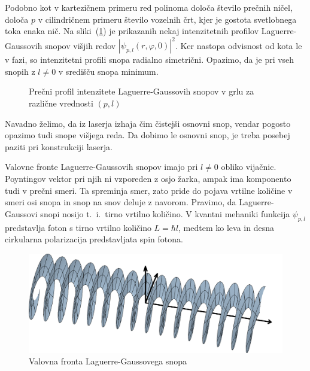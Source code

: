 Podobno kot v kartezičnem primeru red polinoma določa število prečnih ničel,
določa $p$ v cilindričnem primeru število vozelnih črt, kjer je gostota 
svetlobnega toka enaka nič. Na sliki~(\ref{fig:Laguerrovi_presek})
je prikazanih nekaj intenzitetnih profilov Laguerre-Gaussovih snopov
višjih redov $|\psi_{p,l}(r, \varphi, 0)|^2$. Ker nastopa  odvisnost od kota
le v fazi, so intenzitetni profili snopa radialno simetrični. Opazimo, da je pri  
vseh snopih z $l \ne 0$ v središču snopa minimum. 
\begin{figure}[h]
\centering
\def\svgwidth{110truemm} 

\caption{Prečni profil intenzitete Laguerre-Gaussovih snopov v grlu 
za različne vrednosti $(p,l)$}
\label{fig:Laguerrovi_presek}
\end{figure}

Navadno želimo, da iz laserja izhaja čim čistejši osnovni snop, vendar
pogosto opazimo tudi snope višjega reda. Da dobimo le osnovni
snop, je treba posebej paziti pri konstrukciji laserja.

\begin{remark}
Valovne fronte Laguerre-Gaussovih snopov imajo pri $l\ne0$  obliko vijačnic. 
Poyntingov vektor 
pri njih ni vzporeden z osjo žarka, ampak ima komponento tudi v prečni smeri. Ta spreminja smer, 
zato pride do pojava vrtilne količine v smeri osi snopa in snop na snov deluje z navorom. 
Pravimo, da Laguerre-Gaussovi snopi nosijo t.\ i.\ tirno vrtilno količino. 
V kvantni mehaniki funkcija $\psi_{p,l}$ predstavlja foton s tirno vrtilno količino $L = \hbar l$, 
medtem ko leva in desna cirkularna polarizacija predstavljata spin fotona. 
\begin{figure}[h]
\centering
\includegraphics[width=10truecm]{slike/03_Laguerre_faza.png}
\caption{Valovna fronta Laguerre-Gaussovega snopa}
\label{fig:Laguerrova_fronta}
\end{figure}
\end{remark}

